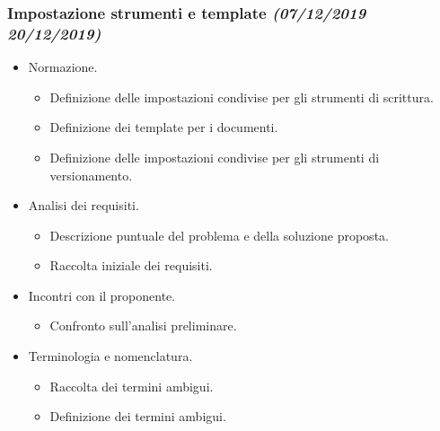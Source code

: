 \documentclass[../piano-di-progetto.tex]{subfiles}
\begin{document}
\subsubsection[Impostazione strumenti e template]{Impostazione strumenti e template {\normalsize\normalfont\itshape(07/12/2019  20/12/2019)}}%
\label{subs:impostazione_strumenti_e_template}
\begin{itemize}
  \item Normazione.
  \begin{itemize}
    \item Definizione delle impostazioni condivise per gli strumenti di scrittura.
    \item Definizione dei template per i documenti.
    \item Definizione delle impostazioni condivise per gli strumenti di versionamento.
  \end{itemize}
  \item Analisi dei requisiti.
  \begin{itemize}
    \item Descrizione puntuale del problema e della soluzione proposta.
    \item Raccolta iniziale dei requisiti.
  \end{itemize}
  \item Incontri con il proponente.
  \begin{itemize}
    \item Confronto sull'analisi preliminare.
  \end{itemize}
  \item Terminologia e nomenclatura.
  \begin{itemize}
    \item Raccolta dei termini ambigui.
    \item Definizione dei termini ambigui.
  \end{itemize}
\end{itemize}
\end{document}
